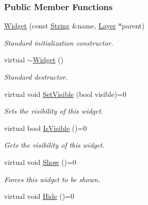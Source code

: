 \subsubsection*{Public Member Functions}
\begin{DoxyCompactItemize}
\item 
\hyperlink{classphys_1_1UI_1_1Widget_a7f992cc7513f1e41795b3569aa8faced}{Widget} (const \hyperlink{namespacephys_aa03900411993de7fbfec4789bc1d392e}{String} \&name, \hyperlink{classphys_1_1UI_1_1Layer}{Layer} $\ast$parent)
\begin{DoxyCompactList}\small\item\em Standard initialization constructor. \item\end{DoxyCompactList}\item 
\hypertarget{classphys_1_1UI_1_1Widget_a95bde61e93544334b376938274617d15}{
virtual \hyperlink{classphys_1_1UI_1_1Widget_a95bde61e93544334b376938274617d15}{$\sim$Widget} ()}
\label{classphys_1_1UI_1_1Widget_a95bde61e93544334b376938274617d15}

\begin{DoxyCompactList}\small\item\em Standard destructor. \item\end{DoxyCompactList}\item 
virtual void \hyperlink{classphys_1_1UI_1_1Widget_ab049233d8d5522a6ab42654b8924a3e0}{SetVisible} (bool visible)=0
\begin{DoxyCompactList}\small\item\em Sets the visibility of this widget. \item\end{DoxyCompactList}\item 
virtual bool \hyperlink{classphys_1_1UI_1_1Widget_aaf1a1bd31b8e626467ce9cdb69bdf7ac}{IsVisible} ()=0
\begin{DoxyCompactList}\small\item\em Gets the visibility of this widget. \item\end{DoxyCompactList}\item 
\hypertarget{classphys_1_1UI_1_1Widget_aa53e64903afc4a1fecd066c814b6c8d4}{
virtual void \hyperlink{classphys_1_1UI_1_1Widget_aa53e64903afc4a1fecd066c814b6c8d4}{Show} ()=0}
\label{classphys_1_1UI_1_1Widget_aa53e64903afc4a1fecd066c814b6c8d4}

\begin{DoxyCompactList}\small\item\em Forces this widget to be shown. \item\end{DoxyCompactList}\item 
\hypertarget{classphys_1_1UI_1_1Widget_abc8e3f88f780e3b36b38086c45311795}{
virtual void \hyperlink{classphys_1_1UI_1_1Widget_abc8e3f88f780e3b36b38086c45311795}{Hide} ()=0}
\label{classphys_1_1UI_1_1Widget_abc8e3f88f780e3b36b38086c45311795}


\end{DoxyCompactItemize}
